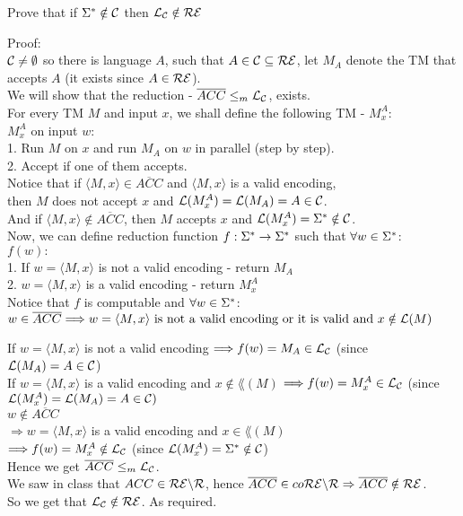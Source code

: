 Prove that if $\Sigma^* \notin \mathcal{C}$ then $\mathcal{L}_{\mathcal{C}} \notin \mathcal{R}\mathcal{E}$

Proof: \\
$\mathcal{C} \neq \emptyset$ so there is language $A$, such that $A \in \mathcal{C} \subseteq \mathcal{R}\mathcal{E}$,
let $M_A$ denote the TM that accepts $A$ (it exists since $A \in \mathcal{R}\mathcal{E}$). \\
We will show that the reduction - $\overline{ACC} \leq_m \mathcal{L}_{\mathcal{C}}$, exists. \\

For every TM $M$ and input $x$, we shall define the following TM - $M_x^A$: \\
$M_x^A$ on input $w$: \\
1. Run $M$ on $x$ and run $M_A$ on $w$ in parallel (step by step). \\
2. Accept if one of them accepts. \\

Notice that if $\langle M, x \rangle \in \overline{ACC}$ and $\langle M, x \rangle$ is a valid encoding, \\
then $M$ does not accept $x$ and $\mathcal{L}(M_x^A) = \mathcal{L}(M_A) = A \in \mathcal{C}$. \\
And if $\langle M, x \rangle \notin \overline{ACC}$,
then $M$ accepts $x$ and $\mathcal{L}(M_x^A) = \Sigma^* \notin \mathcal{C}$. \\

Now, we can define reduction function $f: \Sigma^* \rightarrow \Sigma^*$ such that $\forall w \in \Sigma^*$:\\
$f(w):$ \\
1. If $w = \langle M, x \rangle$ is not a valid encoding - return $M_A$ \\
2. $w = \langle M, x \rangle$ is a valid encoding - return $M_x^A$ \\

Notice that $f$ is computable and $\forall w \in \Sigma^*$: \\
$w \in \overline{ACC} \\
    \Longrightarrow w = \langle M, x \rangle \text{ is not a valid encoding or it is valid and } x \notin \mathcal{L}(M)$

If $w = \langle M, x \rangle$ is not a valid encoding
$\Longrightarrow f(w) = M_A \in \mathcal{L}_{\mathcal{C}}$ (since $\mathcal{L}(M_A) = A \in \mathcal{C}$) \\
If $w = \langle M, x \rangle$ is a valid encoding and $x \notin \lang(M)$
$\Longrightarrow f(w) = M_x^A \in \mathcal{L}_{\mathcal{C}}$ (since $\mathcal{L}(M_x^A) = \mathcal{L}(M_A) = A \in \mathcal{C})$ \\

$w \notin \overline{ACC}$ \\
$\Longrightarrow w = \langle M, x \rangle$ is a valid encoding and $x \in \lang(M)$ \\
$\Longrightarrow f(w) = M_x^A \notin \mathcal{L}_{\mathcal{C}}$ (since $\mathcal{L}(M_x^A) = \Sigma^* \notin \mathcal{C}$) \\

Hence we get $\overline{ACC} \leq_m \mathcal{L}_{\mathcal{C}}$. \\
We saw in class that $ACC \in \mathcal{R}\mathcal{E} \backslash \mathcal{R}$, hence $\overline{ACC} \in co\mathcal{R}\mathcal{E} \backslash \mathcal{R} \Rightarrow \overline{ACC} \notin \mathcal{R}\mathcal{E} $. \\
So we get that $\mathcal{L}_{\mathcal{C}} \notin \mathcal{R}\mathcal{E}$. As required. \\